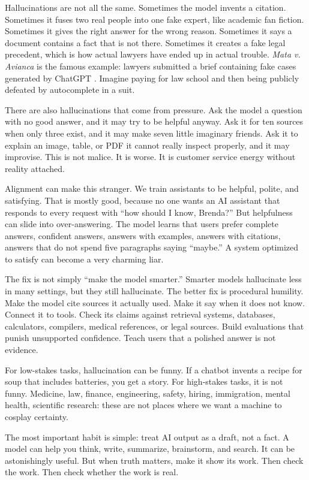 \documentclass[12pt,oneside]{book}
\begin{document}
Hallucinations are not all the same. Sometimes the model invents a citation. Sometimes it fuses two real people into one fake expert, like academic fan fiction. Sometimes it gives the right answer for the wrong reason. Sometimes it says a document contains a fact that is not there. Sometimes it creates a fake legal precedent, which is how actual lawyers have ended up in actual trouble. \emph{Mata v. Avianca} is the famous example: lawyers submitted a brief containing fake cases generated by ChatGPT \parencite{mata2023}. Imagine paying for law school and then being publicly defeated by autocomplete in a suit.

There are also hallucinations that come from pressure. Ask the model a question with no good answer, and it may try to be helpful anyway. Ask it for ten sources when only three exist, and it may make seven little imaginary friends. Ask it to explain an image, table, or PDF it cannot really inspect properly, and it may improvise. This is not malice. It is worse. It is customer service energy without reality attached.

Alignment can make this stranger. We train assistants to be helpful, polite, and satisfying. That is mostly good, because no one wants an AI assistant that responds to every request with ``how should I know, Brenda?'' But helpfulness can slide into over-answering. The model learns that users prefer complete answers, confident answers, answers with examples, answers with citations, answers that do not spend five paragraphs saying ``maybe.'' A system optimized to satisfy can become a very charming liar.

The fix is not simply ``make the model smarter.'' Smarter models hallucinate less in many settings, but they still hallucinate. The better fix is procedural humility. Make the model cite sources it actually used. Make it say when it does not know. Connect it to tools. Check its claims against retrieval systems, databases, calculators, compilers, medical references, or legal sources. Build evaluations that punish unsupported confidence. Teach users that a polished answer is not evidence.

For low-stakes tasks, hallucination can be funny. If a chatbot invents a recipe for soup that includes batteries, you get a story. For high-stakes tasks, it is not funny. Medicine, law, finance, engineering, safety, hiring, immigration, mental health, scientific research: these are not places where we want a machine to cosplay certainty.

The most important habit is simple: treat AI output as a draft, not a fact. A model can help you think, write, summarize, brainstorm, and search. It can be astonishingly useful. But when truth matters, make it show its work. Then check the work. Then check whether the work is real.
\end{document}
